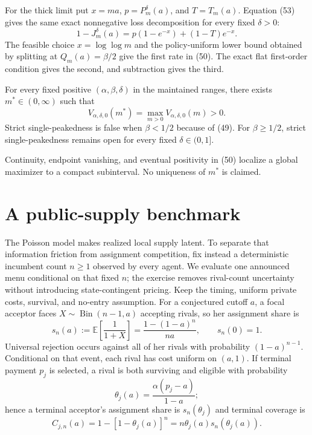 \documentclass[mnsc,dblanonrev]{informs4}
\newcommand{\E}{\mathbb E}
\begin{document}
For the thick limit put $x=ma$, $p=P_m^\delta(a)$, and $T=T_m(a)$.  Equation
(53) gives the same exact nonnegative loss decomposition for every fixed
$\delta>0$:
\[
 1-J_m^\delta(a)=p(1-e^{-x})+(1-T)e^{-x}.                  \tag{55}
\]
The feasible choice $x=\log\log m$ and the policy-uniform lower bound obtained
by splitting at $Q_m(a)=\beta/2$ give the first rate in (50).  The exact flat
first-order condition gives the second, and subtraction gives the third.

\begin{corollary}
\label{cor:bestm}
For every fixed positive $(\alpha,\beta,\delta)$ in the maintained ranges,
there exists $m^*\in(0,\infty)$ such that
\[
 V_{\alpha,\delta,0}(m^*)
 =\max_{m>0}V_{\alpha,\delta,0}(m)>0.                      \tag{56}
\]
Strict single-peakedness is false when $\beta<1/2$ because of (49).  For
$\beta\ge1/2$, strict single-peakedness remains open for every fixed
$\delta\in(0,1]$.
\end{corollary}

Continuity, endpoint vanishing, and eventual positivity in (50) localize a
global maximizer to a compact subinterval.  No uniqueness of $m^*$ is claimed.

\section{A public-supply benchmark}
\label{sec:publicN}

The Poisson model makes realized local supply latent.  To separate that
information friction from assignment competition, fix instead a deterministic
incumbent count $n\ge1$ observed by every agent.  We evaluate one announced
menu conditional on that fixed $n$; the exercise removes rival-count
uncertainty without introducing state-contingent pricing.  Keep the timing,
uniform private costs, survival, and no-entry assumption.
For a conjectured cutoff $a$, a focal acceptor faces
$X\sim\operatorname{Bin}(n-1,a)$ accepting rivals, so her assignment share is
\[
 s_n(a):=\E\!\left[\frac1{1+X}\right]
 =\frac{1-(1-a)^n}{na},
 \qquad s_n(0)=1.                                           \tag{57}
\]
Universal rejection occurs against all of her rivals with probability
$(1-a)^{n-1}$.  Conditional on that event, each rival has cost uniform on
$(a,1)$.  If terminal payment $p_j$ is selected, a rival is both surviving
and eligible with probability
\[
 \theta_j(a)=\frac{\alpha(p_j-a)}{1-a};
\]
hence a terminal acceptor's assignment share is $s_n(\theta_j)$ and terminal
coverage is
\[
 C_{j,n}(a)=1-[1-\theta_j(a)]^n
           =n\theta_j(a)s_n(\theta_j(a)).                   \tag{58}
\]
\end{document}
